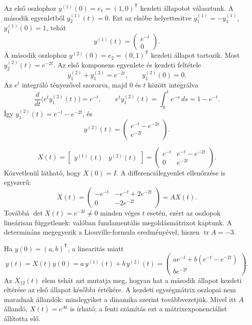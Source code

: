 Az első oszlophoz $y^{(1)}(0)=e_1=(1,0)^{\mathsf T}$ kezdeti állapotot választunk.
A második egyenletből $y_2^{(1)}(t)=0$. Ezt az elsőbe helyettesítve $\dot y_1^{(1)}=-y_1^{(1)}$, $y_1^{(1)}(0)=1$, tehát
\[
 y^{(1)}(t)=\begin{pmatrix}e^{-t}\\0\end{pmatrix}.
\]
A második oszlophoz $y^{(2)}(0)=e_2=(0,1)^{\mathsf T}$ kezdeti állapot tartozik.
Most $y_2^{(2)}(t)=e^{-2t}$. Az első komponens egyenlete és kezdeti feltétele
\[
 \dot y_1^{(2)}+y_1^{(2)}=e^{-2t},\qquad y_1^{(2)}(0)=0.
\]
Az $e^t$ integráló tényezővel szorozva, majd $0$ és $t$ között integrálva
\[
 \frac{d}{dt}\bigl(e^t y_1^{(2)}(t)\bigr)=e^{-t},\qquad
 e^t y_1^{(2)}(t)=\int_0^t e^{-s}\,ds=1-e^{-t}.
\]
Így $y_1^{(2)}(t)=e^{-t}-e^{-2t}$, és
\[
 y^{(2)}(t)=\begin{pmatrix}e^{-t}-e^{-2t}\\e^{-2t}\end{pmatrix}.
\]

\begin{equation}\label{eq:fundamental_example_matrix}
 \boxed{X(t)=\begin{bmatrix}y^{(1)}(t)&y^{(2)}(t)\end{bmatrix}
 =\begin{pmatrix}e^{-t}&e^{-t}-e^{-2t}\\0&e^{-2t}\end{pmatrix}.}
\end{equation}
Közvetlenül látható, hogy $X(0)=I$. A differenciálegyenlet ellenőrzése is egyszerű:
\[
 \dot X(t)=\begin{pmatrix}-e^{-t}&-e^{-t}+2e^{-2t}\\0&-2e^{-2t}\end{pmatrix}
 =AX(t).
\]
Továbbá $\det X(t)=e^{-3t}\neq0$ minden véges $t$ esetén, ezért az oszlopok lineárisan függetlenek: valóban fundamentális megoldásmátrixot kaptunk. A determináns megegyezik a Liouville-formula eredményével, hiszen $\operatorname{tr}A=-3$.


Ha $y(0)=(a,b)^{\mathsf T}$, a linearitás miatt
\begin{equation}\label{eq:fundamental_example_solution}
 y(t)=X(t)y(0)=a\,y^{(1)}(t)+b\,y^{(2)}(t)
 =\begin{pmatrix}a e^{-t}+b(e^{-t}-e^{-2t})\\b e^{-2t}\end{pmatrix}.
\end{equation}
Az $X_{12}(t)$ elem tehát azt mutatja meg, hogyan hat a második állapot kezdeti eltérése az első állapot későbbi értékére. A kezdeti egységmátrix oszlopai nem maradnak állandók: mindegyiket a dinamika szerint továbbvezetjük. Mivel itt $A$ állandó, $X(t)=e^{At}$ is írható; a fenti számítás ezt a mátrixexponenciálist állította elő.


